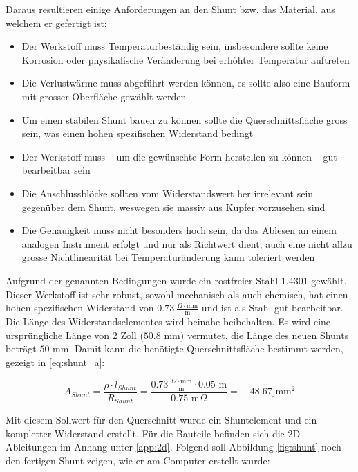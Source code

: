 {Daraus resultieren einige Anforderungen an den Shunt bzw. das Material, aus welchem er gefertigt ist: \begin{itemize}
	\item Der Werkstoff muss Temperaturbeständig sein, insbesondere sollte keine Korrosion oder physikalische Veränderung bei erhöhter Temperatur auftreten
	\item Die Verlustwärme muss abgeführt werden können, es sollte also eine Bauform mit grosser Oberfläche gewählt werden
	\item Um einen stabilen Shunt bauen zu können sollte die Querschnittsfläche gross sein, was einen hohen spezifischen Widerstand bedingt
	\item Der Werkstoff muss -- um die gewünschte Form herstellen zu können -- gut bearbeitbar sein
	\item Die Anschlussblöcke sollten vom Widerstandswert her irrelevant sein gegenüber dem Shunt, weswegen sie massiv aus Kupfer vorzusehen sind
	\item Die Genauigkeit muss nicht besonders hoch sein, da das Ablesen an einem analogen Instrument erfolgt und nur als Richtwert dient, auch eine nicht allzu grosse Nichtlinearität bei Temperaturänderung kann toleriert werden
\end{itemize}

Aufgrund der genannten Bedingungen wurde ein rostfreier Stahl 1.4301 \cite{4301} gewählt. Dieser Werkstoff ist sehr robust, sowohl mechanisch als auch chemisch, hat einen hohen spezifischen Widerstand von $0.73\ \frac{\Omega\cdot\text {mm}}{\text{m}}$ und ist als Stahl gut bearbeitbar. Die Länge des Widerstandselementes wird beinahe beibehalten. Es wird eine ursprüngliche Länge von 2 Zoll ($50.8$ mm) vermutet, die Länge des neuen Shunts beträgt $50$ mm. Damit kann die benötigte Querschnittsfläche bestimmt werden, gezeigt in \ref{eq:shunt_a}:

\begin{equation}
	A_{Shunt}=\frac{\rho\cdot l_{Shunt}}{R_{Shunt}}=\frac{0.73\ \frac{\Omega\cdot\text{mm}}{\text{m}}\cdot 0.05\text{ m}}{0.75\text{ m}\Omega}=\quad\underline{48.67\text{ mm}^2}
\label{eq:shunt_a}
\end{equation}

Mit diesem Sollwert für den Querschnitt wurde ein Shuntelement und ein kompletter Widerstand erstellt. Für die Bauteile befinden sich die 2D-Ableitungen im Anhang unter \ref{app:2d}. Folgend soll Abbildung \ref{fig:shunt} noch den fertigen Shunt zeigen, wie er am Computer erstellt wurde:

}
